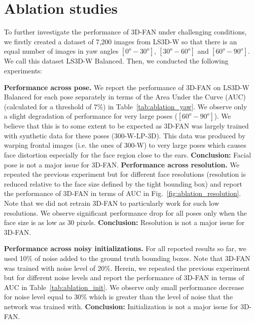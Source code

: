 	\section{Ablation studies} \label{sec:AS}

	To further investigate the performance of 3D-FAN under challenging conditions, we firstly created a dataset of 7,200 images from LS3D-W so that there is an equal number of images in yaw angles $[0^o-30^o]$,  $[30^o-60^o]$ and $[60^o-90^o]$. We call this dataset LS3D-W Balanced. Then, we conducted the following experiments:

	\textbf{Performance across pose.} We report the performance of 3D-FAN on LS3D-W Balanced for each pose separately in terms of the Area Under the Curve (AUC) (calculated for a threshold of 7\%) in Table~\ref{tab:ablation_yaw}. We observe only a slight degradation of performance for very large poses ($[60^o-90^o]$). We believe that this is to some extent to be expected as 3D-FAN was largely trained with synthetic data for these poses (300-W-LP-3D). This data was produced by warping frontal images (i.e. the ones of 300-W) to very large poses which causes face distortion especially for the face region close to the ears. 
	\textbf{Conclusion:} Facial pose is not a major issue for 3D-FAN.  
	\textbf{Performance across resolution.} We repeated the previous experiment but for different face resolutions (resolution is reduced relative to the face size defined by the tight bounding box) and report the performance of 3D-FAN in terms of AUC in Fig.~\ref{fig:ablation_resolution}. Note that we did not retrain 3D-FAN to particularly work for such low resolutions. We observe significant performance drop for all poses only when the face size is as low as 30 pixels. 
	\textbf{Conclusion:} Resolution is not a major issue for 3D-FAN. 

	\textbf{Performance across noisy initializations.} For all reported results so far, we used 10\% of noise added to the ground truth bounding boxes. Note that 3D-FAN was trained with noise level of 20\%. Herein, we repeated the previous experiment but for different noise levels and report the performance of 3D-FAN in terms of AUC in Table~\ref{tab:ablation_init}. We observe only small performance decrease for noise level equal to 30\% which is greater than the level of noise that the network was trained with.   
	\textbf{Conclusion:} Initialization is not a major issue for 3D-FAN.

